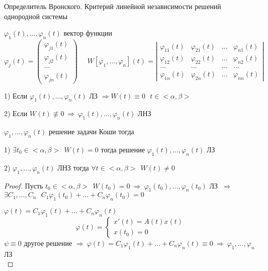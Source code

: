 \begin{title}[\Large]
  Определитель Вронского. Критерий линейной независимости решений однородной
  системы
\end{title}

\begin{define}
  $\varphi_1(t), \ldots, \varphi_n(t)$ вектор функции
  $$
  \varphi_j(t) =
  \left(
  \begin{array}{c}
    \varphi_{j1}(t) \\
    \varphi_{j2}(t) \\
    \cdots \\
    \varphi_{jn}(t)
  \end{array}
  \right) ~~~~~~
  W[\varphi_1, \ldots, \varphi_n](t) =
  \left|
  \begin{array}{cccc}
    \varphi_{11}(t) & \varphi_{21}(t) & \ldots & \varphi_{n1}(t) \\
    \varphi_{12}(t) & \varphi_{22}(t) & \ldots & \varphi_{n2}(t) \\
    \ldots & \ldots & \ldots & \ldots \\
    \varphi_{1n}(t) & \varphi_{2n}(t) & \ldots & \varphi_{nn}(t)
  \end{array}
  \right|
  $$
\end{define}

\begin{block}[Утверждения]
  1) Если $\varphi_1(t), \ldots, \varphi_n(t)$ ЛЗ $\Rightarrow W(t) \equiv 0
  ~~~ t \in <\alpha, \beta>$

  2) Если $W(t) \not\equiv 0 ~ \Rightarrow ~ \varphi_1(t), \ldots,
  \varphi_n(t)$ ЛНЗ
\end{block}

\begin{block}
  $\varphi_1, \ldots, \varphi_n(t)$ решение задачи Коши тогда

  1) $\exists t_0 \in <\alpha, \beta> ~~ W(t) = 0$ тогда решение
  $\varphi_1(t), \ldots, \varphi_n(t)$ ЛЗ

  2) $\varphi_1, \ldots, \varphi_n(t)$ ЛНЗ тогда $\forall t \in <\alpha, \beta>
  ~~ W(t) \not= 0$
\end{block}

\begin{proof}
  Пусть $t_0 \in <\alpha, \beta> ~~ W(t_0) = 0 ~ \Rightarrow ~ \varphi_1(t_0),
  \ldots, \varphi_n(t_0)$ ЛЗ $~\Rightarrow~$ $\exists C_1, \ldots, C_n ~~~
  C_1 \varphi_1(t_0) + \ldots + C_n \varphi_n (t_0) = 0$

  $\varphi(t) = C_1\varphi_1(t) + \ldots + C_n \varphi_n(t)$
  $$
  \varphi(t) =
  \left\{
  \begin{array}{l}
    x'(t) = A(t)x(t) \\
    x(t_0) = 0
  \end{array}
  \right.
  $$
  $\psi \equiv 0$ другое решение $\Rightarrow ~ \varphi(t) = C_1 \varphi_1(t) +
  \ldots + C_n \varphi_n(t) \equiv 0 ~ \Rightarrow ~ \varphi_1, \ldots,
  \varphi_n$ ЛЗ \\
\end{proof}

